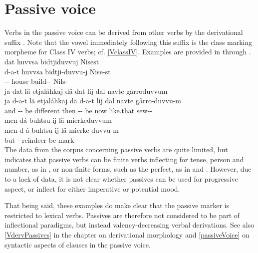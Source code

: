 \section{Passive voice}\label{passiveVinflection}
Verbs in the passive voice can be derived from other verbs by the derivational suffix . Note that the vowel immediately following this suffix is the class marking morpheme for Class IV verbs; cf. \SEC\ref{VclassIV}. 
Examples are provided in  through . 
\ea\label{passEx4}%
\glll	dat huvvsa bidtjiduvvuj Nisest\\
	d-a-t huvvsa bidtji-duvvu-j Nise-st\\
	-- house\BS{} build-- Nils-\\\nopagebreak
{}	
\z
\ea\label{passEx1a}%
\glll	ja dat lä etjaláhkaj dä dat lij dal navte gårroduvvum\\
	ja d-a-t lä etjaláhkaj dä d-a-t lij dal navte gårro-duvvu-m\\
	and -- be\BS{} different then -- be\BS{} now like.that sew--\\\nopagebreak
{}	
\z
\ea\label{passEx1b}%
\glll	men dá buhtsu ij lä mierkeduvvum\\
	men d-á buhtsu ij lä mierke-duvvu-m\\
	but -\BS{} reindeer\BS{} \BS{} be\BS{} mark--\\\nopagebreak
{}	
\z
The data from the corpus concerning passive verbs are quite limited, but indicates that passive verbs can be finite verbs inflecting for tense, person and number, as in , or non-finite forms, such as the perfect, as in  and . However, due to a lack of data, it is not clear whether passives can be used for progressive aspect, or inflect for either imperative or potential mood. 

That being said, these examples do make clear that the passive marker is restricted to lexical verbs. %
Passives are therefore not considered to be part of inflectional paradigms, but instead valency-decreasing verbal derivations. See also \SEC\ref{VdervPassives} in the chapter on derivational morphology and \SEC\ref{passiveVoice} on syntactic aspects of clauses in the passive voice. 


